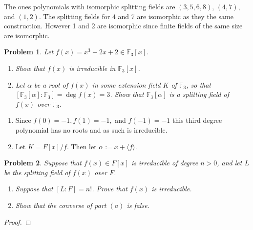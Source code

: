 \documentclass[10pt]{article}
\newcommand{\sk}{\vskip 10mm}
\theoremstyle{plain}
\newtheorem{problem}{Problem}
\theoremstyle{remark}
\begin{document}
The ones polynomials with isomorphic splitting fields are $(3,5,6,8)$, $(4,7)$, and $(1,2)$.
The splitting fields for $4$ and $7$ are isomorphic as they the same construction.
However 1 and 2 are isomorphic since finite fields of the same size are isomorphic.

\sk

\begin{problem}
  Let $f(x) = x^3 + 2x + 2 \in \mathbb{F}_3[x]$.
\begin{enumerate}
    \item Show that $f(x)$ is irreducible in $\mathbb{F}_3[x]$.
    \item Let $\alpha$ be a root of $f(x)$ in some extension field $K$
      of $\mathbb{F}_3$, so that
      $[\mathbb{F}_3[\alpha]: \mathbb{F}_3] = \deg f(x) = 3$.
      Show that $\mathbb{F}_3[\alpha]$ is a splitting field of $f(x)$
      over $\mathbb{F}_3$.
\end{enumerate}
\end{problem}

\begin{enumerate}
\item Since $f(0)=-1, f(1)=-1,$ and $f(-1)=-1$ this third degree polynomial has no
  roots and as such is irreducible.
\item Let $K=F[x]/f$. Then let $\alpha:=x+\langle f\rangle$. 
\end{enumerate}

\sk

\begin{problem}
  Suppose that $f(x) \in F[x]$ is irreducible of degree $n > 0$,
  and let $L$ be the splitting field of $f(x)$ over $F$.
\begin{enumerate}
    \item Suppose that $[L:F]=n!$. Prove that $f(x)$ is irreducible.
    \item Show that the converse of part $(a)$ is false.
\end{enumerate}
\end{problem}

\begin{proof}
  
\end{proof}

\end{document}
